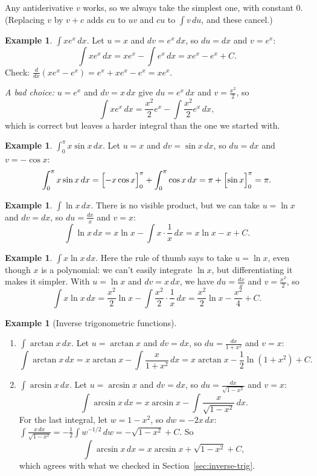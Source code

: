 \documentclass[12pt,letterpaper]{article}
\theoremstyle{definition}
\newtheorem{example}[theorem]{Example}
\begin{document}
Any antiderivative $v$ works, so we always take the simplest one, with
constant $0$. (Replacing $v$ by $v+c$ adds $cu$ to $uv$ and $cu$ to
$\int v\,du$, and these cancel.)

\begin{example}
  $\displaystyle\int xe^x\,dx$. Let $u=x$ and $dv=e^x\,dx$, so $du=dx$ and
  $v=e^x$:
  \[
    \int xe^x\,dx=xe^x-\int e^x\,dx=xe^x-e^x+C.
  \]
  Check: $\frac{d}{dx}(xe^x-e^x)=e^x+xe^x-e^x=xe^x$.

  \emph{A bad choice:} $u=e^x$ and $dv=x\,dx$ give $du=e^x\,dx$ and
  $v=\frac{x^2}{2}$, so
  \[
    \int xe^x\,dx=\frac{x^2}{2}e^x-\int\frac{x^2}{2}e^x\,dx,
  \]
  which is correct but leaves a harder integral than the one we started with.
\end{example}

\begin{example}
  $\displaystyle\int_0^\pi x\sin x\,dx$. Let $u=x$ and $dv=\sin x\,dx$, so
  $du=dx$ and $v=-\cos x$:
  \[
    \int_0^\pi x\sin x\,dx=\Bigl[-x\cos x\Bigr]_0^\pi+\int_0^\pi\cos x\,dx
      =\pi+\Bigl[\sin x\Bigr]_0^\pi=\pi.
  \]
\end{example}

\begin{example}
  $\displaystyle\int\ln x\,dx$. There is no visible product, but we can take
  $u=\ln x$ and $dv=dx$, so $du=\frac{dx}{x}$ and $v=x$:
  \[
    \int\ln x\,dx=x\ln x-\int x\cdot\frac1x\,dx=x\ln x-x+C.
  \]
\end{example}

\begin{example}
  $\displaystyle\int x\ln x\,dx$. Here the rule of thumb says to take
  $u=\ln x$, even though $x$ is a polynomial: we can't easily integrate
  $\ln x$, but differentiating it makes it simpler. With $u=\ln x$ and
  $dv=x\,dx$, we have $du=\frac{dx}{x}$ and $v=\frac{x^2}{2}$, so
  \[
    \int x\ln x\,dx=\frac{x^2}{2}\ln x-\int\frac{x^2}{2}\cdot\frac1x\,dx
      =\frac{x^2}{2}\ln x-\frac{x^2}{4}+C.
  \]
\end{example}

\begin{example}[Inverse trigonometric functions]
  \begin{enumerate}[label=(\alph*)]
    \item $\displaystyle\int\arctan x\,dx$. Let $u=\arctan x$ and $dv=dx$, so
      $du=\frac{dx}{1+x^2}$ and $v=x$:
      \[
        \int\arctan x\,dx=x\arctan x-\int\frac{x}{1+x^2}\,dx
          =x\arctan x-\frac12\ln(1+x^2)+C.
      \]
    \item $\displaystyle\int\arcsin x\,dx$. Let $u=\arcsin x$ and $dv=dx$, so
      $du=\frac{dx}{\sqrt{1-x^2}}$ and $v=x$:
      \[
        \int\arcsin x\,dx=x\arcsin x-\int\frac{x}{\sqrt{1-x^2}}\,dx.
      \]
      For the last integral, let $w=1-x^2$, so $dw=-2x\,dx$:
      $\int\frac{x\,dx}{\sqrt{1-x^2}}=-\frac12\int w^{-1/2}\,dw
      =-\sqrt{1-x^2}+C$. So
      \[
        \int\arcsin x\,dx=x\arcsin x+\sqrt{1-x^2}+C,
      \]
      which agrees with what we checked in Section~\ref{sec:inverse-trig}.
  \end{enumerate}
\end{example}
\end{document}

